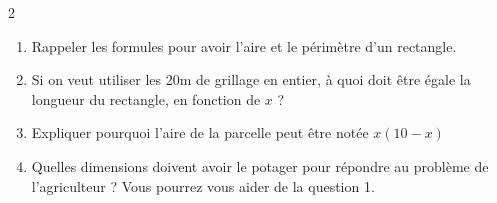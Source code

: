 \documentclass[10pt,a4paper]{article}
\begin{document}
\begin{multicols}{2}
\begin{exo}[][appro]
\begin{enumerate}

    \begin{enumerate}
        \item Rappeler les formules pour avoir l'aire et le périmètre d'un rectangle.
        \item Si on veut utiliser les 20m de grillage en entier, à quoi doit être égale la longueur du rectangle, en fonction de \(x\) ?
        \item Expliquer pourquoi l'aire de la parcelle peut être notée \(x(10-x)\)
        \item Quelles dimensions doivent avoir le potager pour répondre au problème de l'agriculteur ? Vous pourrez vous aider de la question 1.
    \end{enumerate}
    \end{enumerate}

\end{exo}



\end{multicols}
\end{document}
